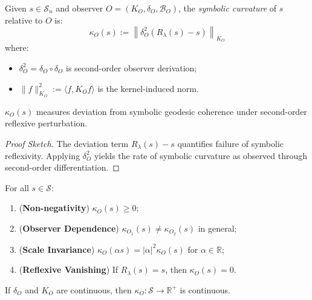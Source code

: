 \begin{definition}
\label{definition:bk4_symbolic_curvature}
Given $s \in \mathcal{S}_n$ and observer $O = (K_O, \delta_O, \mathcal{B}_O)$, the \emph{symbolic curvature} of $s$ relative to $O$ is:
\[
\kappa_O(s) := \left\| \delta_O^2(R_\lambda(s) - s) \right\|_{K_O}
\]
where:
\begin{itemize}
    \item $\delta_O^2 = \delta_O \circ \delta_O$ is second-order observer derivation;
    \item $\|f\|_{K_O}^2 := \langle f, K_O f \rangle$ is the kernel-induced norm.
\end{itemize}
\end{definition}

\begin{proposition}
\label{proposition:bk4_geodesic_failure}
$\kappa_O(s)$ measures deviation from symbolic geodesic coherence under second-order reflexive perturbation.
\end{proposition}

\begin{proof}[Proof Sketch]
The deviation term $R_\lambda(s) - s$ quantifies failure of symbolic reflexivity. Applying $\delta_O^2$ yields the rate of symbolic curvature as observed through second-order differentiation.
\end{proof}

\begin{theorem}
\label{theorem:bk4_symbolic_curvature_properties}
For all $s \in \mathcal{S}$:
\begin{enumerate}
    \item (\textbf{Non-negativity}) $\kappa_O(s) \geq 0$;
    \item (\textbf{Observer Dependence}) $\kappa_{O_1}(s) \ne \kappa_{O_2}(s)$ in general;
    \item (\textbf{Scale Invariance}) $\kappa_O(\alpha s) = |\alpha|^2 \kappa_O(s)$ for $\alpha \in \mathbb{R}$;
    \item (\textbf{Reflexive Vanishing}) If $R_\lambda(s) = s$, then $\kappa_O(s) = 0$.
\end{enumerate}
\end{theorem}

\begin{theorem}[Continuity]
\label{theorem:bk4_curvature_continuity}
If $\delta_O$ and $K_O$ are continuous, then $\kappa_O : \mathcal{S} \to \mathbb{R}^+$ is continuous.
\end{theorem}


